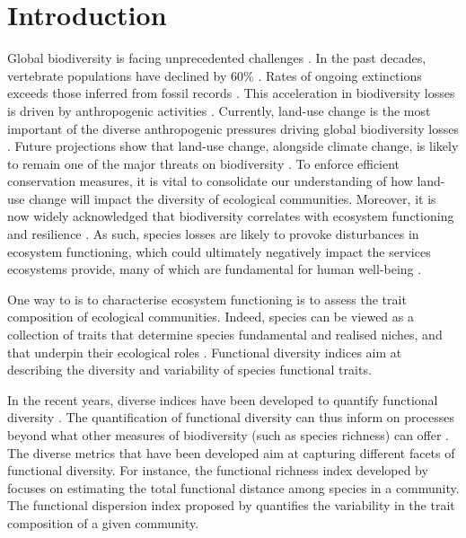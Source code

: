 \section{Introduction}
Global biodiversity is facing unprecedented challenges \citep{Pereira2012, Newbold2019_ets}. In the past decades, vertebrate populations have declined by 60\% \citep{LivingPlanetIndex2018}. Rates of ongoing extinctions exceeds those inferred from fossil records \citep{DeVos2015,Barnosky2011, Johnson2017}. This acceleration in biodiversity losses is driven by anthropogenic activities \citep{Steffen2015}. Currently, land-use change is the most important of the diverse anthropogenic pressures driving global biodiversity losses \citep{Newbold2015, Foley2005}. Future projections show that land-use change, alongside climate change, is likely to remain one of the major threats on biodiversity \citep{Newbold2018}. To enforce efficient conservation measures, it is vital to consolidate our understanding of how land-use change will impact the diversity of ecological communities. Moreover, it is now widely acknowledged that biodiversity correlates with  ecosystem functioning and resilience \citep{Tilman2014, Oliver2015, Hooper2012}. As such, species losses are likely to provoke disturbances in ecosystem functioning, which could ultimately negatively impact the services ecosystems provide, many of which are fundamental for human well-being \citep{MEA2005}. 

One way to is to characterise ecosystem functioning is to assess the trait composition of ecological communities. Indeed, species can be viewed as a collection of traits that determine species fundamental and realised niches, and that underpin their ecological roles \citep{Violle2007, Cadotte2011}. Functional diversity indices aim at describing the diversity and variability of species functional traits.

In the recent years, diverse indices have been developed to quantify functional diversity \citep{Schleuter2010, Legras2018, Villeger2008, Ricotta2016, Botta-Dukat2009, Laliberte2010}. The quantification of functional diversity can thus inform on processes beyond what other measures of biodiversity (such as species richness) can offer \citep{Cadotte2011, Laureto2015}. The diverse metrics that have been developed aim at capturing different facets of functional diversity. For instance, the functional richness index developed by \citet{Petchey2002} focuses on estimating the total functional distance among species in a community. The functional dispersion index proposed by \citet{Laliberte2010} quantifies the variability in the trait composition of a given community. 

